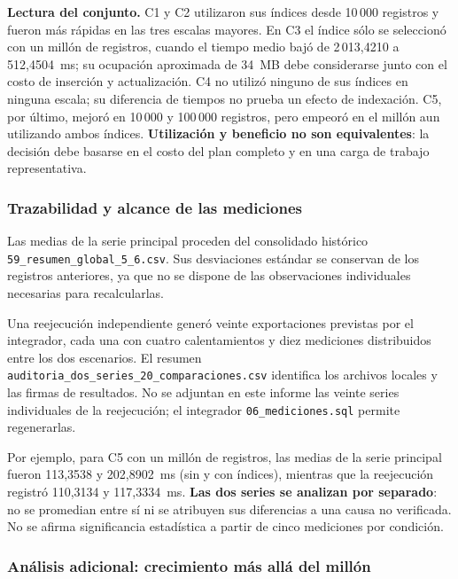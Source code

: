 \documentclass[12pt,a4paper]{article}
\begin{document}
\textbf{Lectura del conjunto.} C1 y C2 utilizaron sus índices desde
10\,000 registros y fueron más rápidas en las tres escalas mayores.
En C3 el índice sólo se seleccionó con un millón de registros, cuando
el tiempo medio bajó de 2\,013,4210 a 512,4504~ms; su ocupación
aproximada de 34~MB debe considerarse junto con el costo de inserción
y actualización. C4 no utilizó ninguno de sus índices en ninguna
escala; su diferencia de tiempos no prueba un efecto de indexación.
C5, por último, mejoró en 10\,000 y 100\,000 registros, pero empeoró
en el millón aun utilizando ambos índices. \textbf{Utilización y
beneficio no son equivalentes}: la decisión debe basarse en el costo
del plan completo y en una carga de trabajo representativa.

\Needspace{0.30\textheight}
\subsubsection{Trazabilidad y alcance de las mediciones}
\label{sec:trazabilidad-series-57}

Las medias de la serie principal proceden del consolidado histórico
\nolinkurl{59_resumen_global_5_6.csv}. Sus desviaciones estándar
se conservan de los registros anteriores, ya que no se dispone
de las observaciones individuales necesarias para recalcularlas.

Una reejecución independiente generó veinte exportaciones previstas
por el integrador, cada una con cuatro calentamientos y diez
mediciones distribuidos entre los dos escenarios. El resumen
\nolinkurl{auditoria_dos_series_20_comparaciones.csv} identifica
los archivos locales y las firmas de resultados. No se adjuntan en
este informe las veinte series individuales de la reejecución; el
integrador \texttt{06\_mediciones.sql} permite regenerarlas.

Por ejemplo, para C5 con un millón de registros, las medias de la
serie principal fueron 113,3538 y 202,8902~ms (sin y con índices),
mientras que la reejecución registró 110,3134 y 117,3334~ms.
\textbf{Las dos series se analizan por separado}: no se promedian
entre sí ni se atribuyen sus diferencias a una causa no verificada.
No se afirma significancia estadística a partir de cinco mediciones
por condición.

\subsubsection{Análisis adicional: crecimiento más allá del millón}
\label{sec:extra-escalabilidad}
\end{document}
